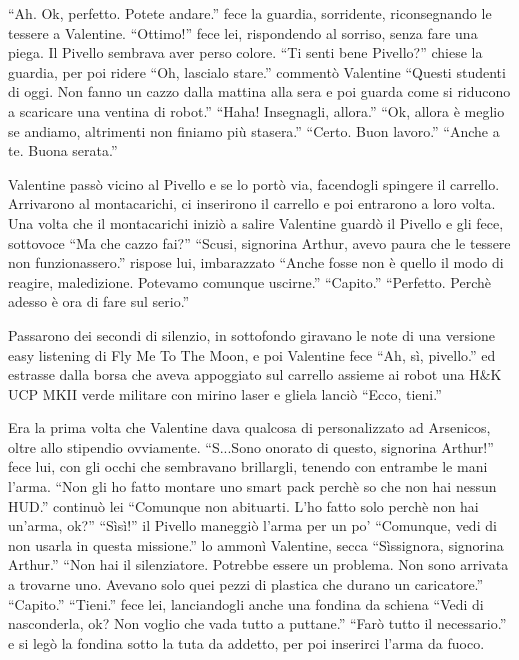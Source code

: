     ``Ah. Ok, perfetto. Potete andare.'' fece la guardia, sorridente, riconsegnando le tessere a Valentine. ``Ottimo!''
    fece lei, rispondendo al sorriso, senza fare una piega. Il Pivello sembrava aver perso colore. ``Ti senti bene
    Pivello?'' chiese la guardia, per poi ridere ``Oh, lascialo stare.'' commentò Valentine ``Questi studenti di oggi.
    Non fanno un cazzo dalla mattina alla sera e poi guarda come si riducono a scaricare una ventina di robot.'' ``Haha!
    Insegnagli, allora.'' ``Ok, allora è meglio se andiamo, altrimenti non finiamo più stasera.'' ``Certo. Buon
    lavoro.'' ``Anche a te. Buona serata.''

    Valentine passò vicino al Pivello e se lo portò via, facendogli spingere il carrello. Arrivarono al montacarichi, ci
    inserirono il carrello e poi entrarono a loro volta. Una volta che il montacarichi iniziò a salire Valentine guardò
    il Pivello e gli fece, sottovoce ``Ma che cazzo fai?'' ``Scusi, signorina Arthur, avevo paura che le tessere non
    funzionassero.'' rispose lui, imbarazzato ``Anche fosse non è quello il modo di reagire, maledizione. Potevamo
    comunque uscirne.'' ``Capito.'' ``Perfetto. Perchè adesso è ora di fare sul serio.''

    Passarono dei secondi di silenzio, in sottofondo giravano le note di una versione easy listening di Fly Me To The
    Moon, e poi Valentine fece ``Ah, sì, pivello.'' ed estrasse dalla borsa che aveva appoggiato sul carrello assieme ai
    robot una H\&K UCP MKII verde militare con mirino laser e gliela lanciò ``Ecco, tieni.''

    Era la prima volta che Valentine dava qualcosa di personalizzato ad Arsenicos, oltre allo stipendio ovviamente.
    ``S...Sono onorato di questo, signorina Arthur!'' fece lui, con gli occhi che sembravano brillargli, tenendo con
    entrambe le mani l'arma. ``Non gli ho fatto montare uno smart pack perchè so che non hai nessun HUD.'' continuò lei
    ``Comunque non abituarti. L'ho fatto solo perchè non hai un'arma, ok?'' ``Sìsì!'' il Pivello maneggiò l'arma per un
    po' ``Comunque, vedi di non usarla in questa missione.'' lo ammonì Valentine, secca ``Sìssignora, signorina
    Arthur.'' ``Non hai il silenziatore. Potrebbe essere un problema. Non sono arrivata a trovarne uno. Avevano solo
    quei pezzi di plastica che durano un caricatore.'' ``Capito.'' ``Tieni.'' fece lei, lanciandogli anche una fondina
    da schiena ``Vedi di nasconderla, ok? Non voglio che vada tutto a puttane.'' ``Farò tutto il necessario.'' e si legò
    la fondina sotto la tuta da addetto, per poi inserirci l'arma da fuoco.

